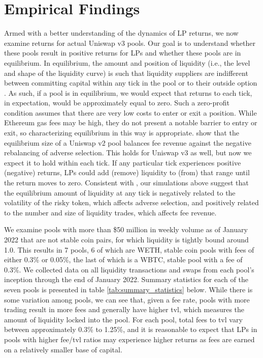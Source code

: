 \documentclass[11pt]{article}
\begin{document}
\section{Empirical Findings}\label{sec:5}

Armed with a better understanding of the dynamics of LP returns, we now examine returns for actual Uniswap v3 pools. Our goal is to understand whether these pools result in positive returns for LPs and whether these pools are in equilibrium. In equilibrium, the amount and position of liquidity (i.e., the level and shape of the liquidity curve) is such that liquidity suppliers are indifferent between committing capital within any tick in the pool or to their outside option \citep{Lehar2021DecentralizedE}. As such, if a pool is in equilibrium, we would expect that returns to each tick, in expectation, would be approximately equal to zero. Such a zero-profit condition assumes that there are very low costs to enter or exit a position. While Ethereum gas fees may be high, they do not present a notable barrier to entry or exit, so characterizing equilibrium in this way is appropriate. \citet{Lehar2021DecentralizedE} show that the equilibrium size of a Uniswap v2 pool balances fee revenue against the negative rebalancing of adverse selection. This holds for Uniswap v3 as well, but now we expect it to hold within each tick. If any particular tick experiences positive (negative) returns, LPs could add (remove) liquidity to (from) that range until the return moves to zero. Consistent with \citet{Aoyagi2020LiquidityPB}, our simulations above suggest that the equilibrium amount of liquidity at any tick is negatively related to the volatility of the risky token, which affects adverse selection, and positively related to the number and size of liquidity trades, which affects fee revenue.

We examine pools with more than \$50 million in weekly volume as of January 2022 that are not stable coin pairs, for which liquidity is tightly bound around 1.0. This results in 7 pools, 6 of which are WETH, stable coin pools with fees of either 0.3\% or 0.05\%, the last of which is a WBTC, stable pool with a fee of 0.3\%. We collected data on all liquidity transactions and swaps from each pool's inception through the end of January 2022. Summary statistics for each of the seven pools is presented in table \ref{tab:summary_statistics} below. While there is some variation among pools, we can see that, given a fee rate, pools with more trading result in more fees and generally have higher \gls{tvl}, which measures the amount of liquidity locked into the pool. For each pool, total fees to \gls{tvl} vary between approximately 0.3\% to 1.25\%, and it is reasonable to expect that LPs in pools with higher fee/\gls{tvl} ratios may experience higher returns as fees are earned on a relatively smaller base of capital.
\end{document}
